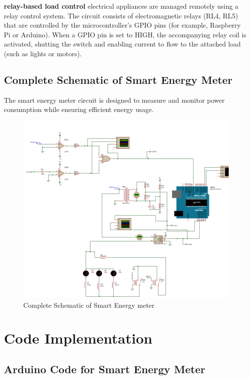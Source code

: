\documentclass[a4paper,12pt]{report}
\begin{document}
\textbf{relay-based load control} electrical appliances are managed remotely using a relay control system. The circuit consists of electromagnetic relays (RL4, RL5) that are controlled by the microcontroller's GPIO pins (for example, Raspberry Pi or Arduino). When a GPIO pin is set to HIGH, the accompanying relay coil is activated, shutting the switch and enabling current to flow to the attached load (such as lights or motors).

\subsection{Complete Schematic of Smart Energy Meter}
The smart energy meter circuit is designed to measure and monitor power consumption while ensuring efficient energy usage.
\begin{figure}[H]
    \centering
    \includegraphics[width=1\textwidth]{smartEnergy.PNG} %
    \caption{Complete Schematic of Smart Energy meter}
\end{figure}

\section{Code Implementation}

\subsection{Arduino Code for Smart Energy Meter}
\end{document}
